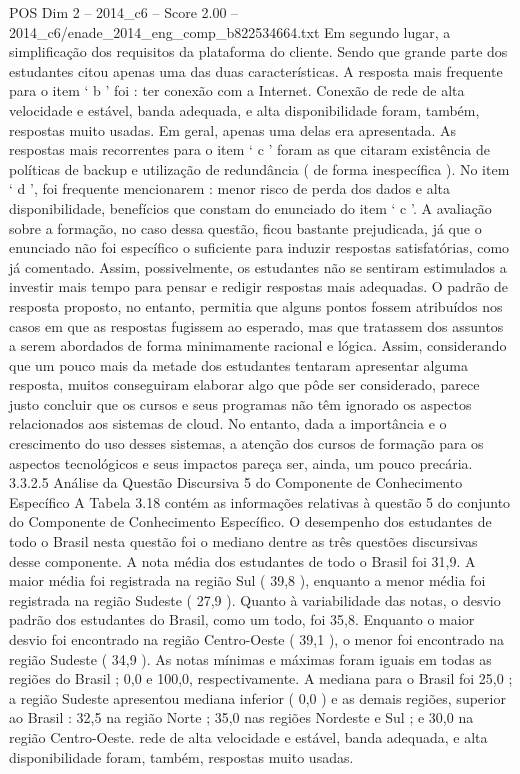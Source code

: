 \begin{textsample}{POS Dim 2 – 2014\_c6 – Score 2.00 – 2014\_c6/enade\_2014\_eng\_comp\_b822534664.txt}
Em segundo lugar, a simplificação dos requisitos da plataforma do cliente.
Sendo que grande parte dos estudantes citou apenas uma das duas características.
A resposta mais frequente para o item ‘ b ’ foi : ter conexão com a Internet.
Conexão de rede de alta velocidade e estável, banda adequada, e alta disponibilidade foram, também, respostas muito usadas.
Em geral, apenas uma delas era apresentada.
As respostas mais recorrentes para o item ‘ c ’ foram as que citaram existência de políticas de backup e utilização de redundância ( de forma inespecífica ).
No item ‘ d ’, foi frequente mencionarem : menor risco de perda dos dados e alta disponibilidade, benefícios que constam do enunciado do item ‘ c ’.
A avaliação sobre a formação, no caso dessa questão, ficou bastante prejudicada, já que o enunciado não foi específico o suficiente para induzir respostas satisfatórias, como já comentado.
Assim, possivelmente, os estudantes não se sentiram estimulados a investir mais tempo para pensar e redigir respostas mais adequadas.
O padrão de resposta proposto, no entanto, permitia que alguns pontos fossem atribuídos nos casos em que as respostas fugissem ao esperado, mas que tratassem dos assuntos a serem abordados de forma minimamente racional e lógica.
Assim, considerando que um pouco mais da metade dos estudantes tentaram apresentar alguma resposta, muitos conseguiram elaborar algo que pôde ser considerado, parece justo concluir que os cursos e seus programas não têm ignorado os aspectos relacionados aos sistemas de cloud.
No entanto, dada a importância e o crescimento do uso desses sistemas, a atenção dos cursos de formação para os aspectos tecnológicos e seus impactos pareça ser, ainda, um pouco precária. 3.3.2.5 Análise da Questão Discursiva 5 do Componente de Conhecimento Específico A Tabela 3.18 contém as informações relativas à questão 5 do conjunto do Componente de Conhecimento Específico.
O desempenho dos estudantes de todo o Brasil nesta questão foi o mediano dentre as três questões discursivas desse componente.
A nota média dos estudantes de todo o Brasil foi 31,9.
A maior média foi registrada na região Sul ( 39,8 ), enquanto a menor média foi registrada na região Sudeste ( 27,9 ).
Quanto à variabilidade das notas, o desvio padrão dos estudantes do Brasil, como um todo, foi 35,8.
Enquanto o maior desvio foi encontrado na região Centro-Oeste ( 39,1 ), o menor foi encontrado na região Sudeste ( 34,9 ).
As notas mínimas e máximas foram iguais em todas as regiões do Brasil ; 0,0 e 100,0, respectivamente.
A mediana para o Brasil foi 25,0 ; a região Sudeste apresentou mediana inferior ( 0,0 ) e as demais regiões, superior ao Brasil : 32,5 na região Norte ; 35,0 nas regiões Nordeste e Sul ; e 30,0 na região Centro-Oeste. rede de alta velocidade e estável, banda adequada, e alta disponibilidade foram, também, respostas muito usadas.

\end{textsample}
